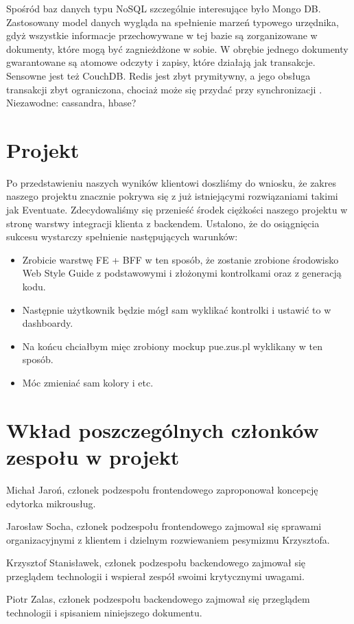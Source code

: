 \documentclass[licencjacka]{pracamgr}
\begin{document}
Spośród baz danych typu NoSQL szczególnie interesujące było Mongo DB. Zastosowany model danych wygląda na spełnienie
marzeń typowego urzędnika, gdyż wszystkie informacje przechowywane w tej bazie są zorganizowane w dokumenty,
które mogą być zagnieżdżone w sobie. W obrębie jednego dokumenty gwarantowane są atomowe odczyty i zapisy, które
działają jak transakcje.
Sensowne jest też CouchDB. Redis jest zbyt prymitywny, a jego obsługa transakcji zbyt ograniczona, chociaż
może się przydać przy synchronizacji \cite{redislock}. Niezawodne: cassandra, hbase?

\chapter{Projekt}

Po przedstawieniu naszych wyników klientowi doszliśmy do wniosku, że zakres naszego projektu znacznie pokrywa się z już istniejącymi rozwiązaniami takimi jak Eventuate. Zdecydowaliśmy się przenieść środek ciężkości naszego projektu w stronę warstwy integracji klienta z backendem. Ustalono, że do osiągnięcia sukcesu wystarczy spełnienie następujących warunków: %
\begin{itemize}
	\item Zrobicie warstwę FE + BFF w ten sposób, że zostanie zrobione środowisko Web Style Guide z podstawowymi i złożonymi kontrolkami oraz z generacją kodu.
	\item Następnie użytkownik będzie mógł sam wyklikać kontrolki i ustawić to w dashboardy.
	\item Na końcu chciałbym mięc zrobiony mockup pue.zus.pl wyklikany w ten sposób.
	\item Móc zmieniać sam kolory i etc.
\end{itemize}

\chapter{Wkład poszczególnych członków zespołu w projekt}\label{r:wklad}
Michał Jaroń, członek podzespołu frontendowego zaproponował koncepcję edytorka mikrousług.

Jarosław Socha, członek podzespołu frontendowego zajmował się sprawami organizacyjnymi z klientem i dzielnym rozwiewaniem pesymizmu Krzysztofa.

Krzysztof Stanisławek, członek podzespołu backendowego zajmował się przeglądem technologii i wspierał zespół swoimi krytycznymi uwagami.

Piotr Zalas, członek podzespołu backendowego zajmował się przeglądem technologii i spisaniem niniejszego dokumentu.
\end{document}
